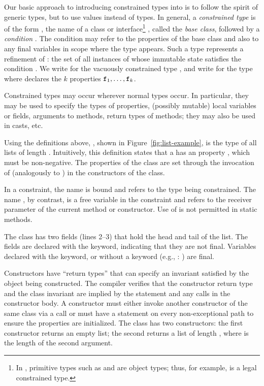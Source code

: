 Our basic approach to introducing constrained types into \Xten{}
is to follow the spirit of generic types, but to use values
instead of types.
%
In general, a {\em constrained type} is of the form ,
the name of a class or interface\footnote{In \Xten{}, primitive
types such as  and  are object types; thus,
for example,  is a legal constrained type.}
, called the {\em base class}, followed
by a {\em condition} .
The condition may refer to the properties of the base class
and also to any final variables in scope where the type appears.
Such a type represents a refinement of : the set of all
instances of  whose immutable state satisfies the
condition .
%
We write  for 
the vacuously constrained type , and
write
 for
the type
where  declares the $k$ properties
${\tt f}_1,\ldots,{\tt f}_k$.

Constrained types may occur wherever normal types occur. In
particular, they may be used to specify the types of properties,
(possibly mutable) local variables or fields,
arguments to methods, return types of methods; they may also be
used in casts, etc.

Using the definitions above, , shown in
Figure~\ref{fig:list-example}, is the type of all lists of
length .
%
Intuitively, this definition states that a  has an 
property , which must be non-negative.
The properties
of the
class are set through the invocation of \tcd{(\ldots)}
(analogously to \tcd{(\ldots)}) in the constructors
of the class.

In a constraint, the name  is bound and refers to the type being
constrained.  The name , by contrast, is a free
variable in the
constraint and refers to the receiver parameter of the current
method or constructor.  Use of  is not permitted in static
methods.

The  class has two
fields (lines 2--3) that hold the head and tail of the list.  The fields are
declared with the  keyword, indicating that they are
not final.  Variables declared with the  keyword, or
without a keyword (e.g., : ) are final.

Constructors have ``return
types'' that can specify an invariant satisfied by the object being
constructed.  The compiler verifies that the
constructor return type and the class invariant are implied by the
 statement and any  calls in the constructor
body.
A constructor must either invoke another constructor of the same
class via a
 call
or must have a  statement on every
non-exceptional path
to ensure the properties are initialized.
The  class has two constructors: the first
constructor returns an empty list;
the second
returns a list of length , where  is the length
of the second argument. 

